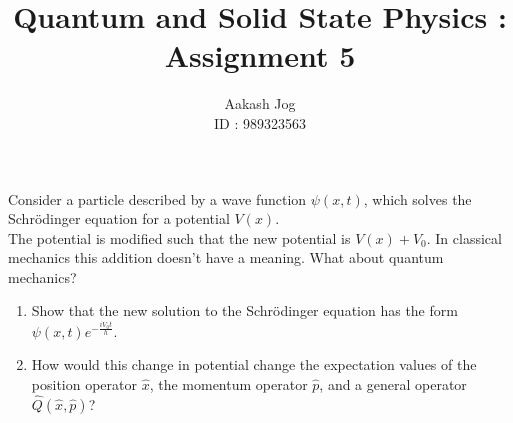 \documentclass[fleqn, a4paper, 11pt, oneside]{amsart}
\title{Quantum and Solid State Physics : Assignment 5}
\author
{
	Aakash Jog\\
	ID : 989323563
}
\date{\formatdate{19}{11}{2015}}
\theoremstyle{definition}
\theoremstyle{theorem}
\begin{document}

\maketitle

\setcounter{question}{1}
\begin{question}
	Consider a particle described by a wave function $\psi(x,t)$, which solves the Schrödinger equation for a potential $V(x)$.\\
	The potential is modified such that the new potential is $V(x) + V_0$.
	In classical mechanics this addition doesn't have a meaning.
	What about quantum mechanics?
	\begin{enumerate}
		\item Show that the new solution to the Schrödinger equation has the form $\psi(x,t) e^{-\frac{i V_0 t}{h}}$.
		\item How would this change in potential change the expectation values of the position operator $\hat{x}$, the momentum operator $\hat{p}$, and a general operator $\hat{Q}\left( \hat{x},\hat{p} \right)$?
	\end{enumerate}
\end{question}
\end{document}
